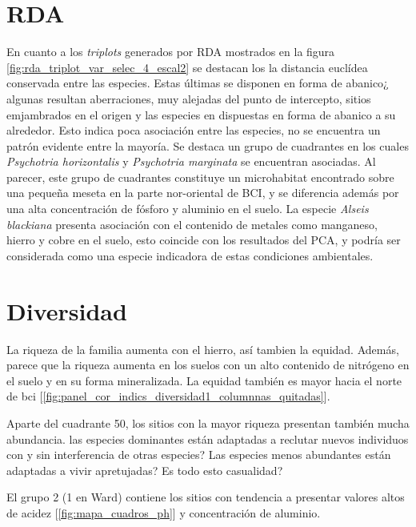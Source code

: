 \documentclass[11pt,]{article}
\begin{document}
\section{RDA}\label{rda}

En cuanto a los \emph{triplots} generados por RDA mostrados en la figura
\ref{fig:rda_triplot_var_selec_4_escal2} se destacan los la distancia
euclídea conservada entre las especies. Estas últimas se disponen en
forma de abanico¿ algunas resultan aberraciones, muy alejadas del punto
de intercepto, sitios emjambrados en el origen y las especies en
dispuestas en forma de abanico a su alrededor. Esto indica poca
asociación entre las especies, no se encuentra un patrón evidente entre
la mayoría. Se destaca un grupo de cuadrantes en los cuales
\emph{Psychotria horizontalis} y \emph{Psychotria marginata} se
encuentran asociadas. Al parecer, este grupo de cuadrantes constituye un
microhabitat encontrado sobre una pequeña meseta en la parte
nor-oriental de BCI, y se diferencia además por una alta concentración
de fósforo y aluminio en el suelo. La especie \emph{Alseis blackiana}
presenta asociación con el contenido de metales como manganeso, hierro y
cobre en el suelo, esto coincide con los resultados del PCA, y podría
ser considerada como una especie indicadora de estas condiciones
ambientales.

\section{Diversidad}\label{diversidad}

La riqueza de la familia aumenta con el hierro, así tambien la equidad.
Además, parece que la riqueza aumenta en los suelos con un alto
contenido de nitrógeno en el suelo y en su forma mineralizada. La
equidad también es mayor hacia el norte de bci
{[}\ref{fig:panel_cor_indics_diversidad1_columnnas_quitadas}{]}.

Aparte del cuadrante 50, los sitios con la mayor riqueza presentan
también mucha abundancia. las especies dominantes están adaptadas a
reclutar nuevos individuos con y sin interferencia de otras especies?
Las especies menos abundantes están adaptadas a vivir apretujadas? Es
todo esto casualidad?

El grupo 2 (1 en Ward) contiene los sitios con tendencia a presentar
valores altos de acidez {[}\ref{fig:mapa_cuadros_ph}{]} y concentración
de aluminio.
\end{document}
